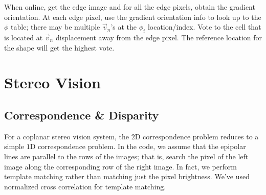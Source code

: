 \documentclass{report}
\begin{document}
When online, get the edge image and for all the edge pixels, obtain the gradient orientation. At each edge pixel, use the gradient orientation info to look up to the $\phi$ table; there may be multiple $\vec v_n$'s at the $\phi_i$ location/index. Vote to the cell that is located at $\vec v_n$ displacement away from the edge pixel. The reference location for the shape will get the highest vote.



\section{Stereo Vision}
\subsection{Correspondence \& Disparity}
\hspace{\parindent}For a coplanar stereo vision system, the $2$D correspondence problem reduces to a simple $1$D correspondence problem. In the code, we assume that the epipolar lines are parallel to the rows of the images; that is, search the pixel of the left image along the corresponding row of the right image. In fact, we perform template matching rather than matching just the pixel brightness. We've used normalized cross correlation for template matching.



\end{document}
